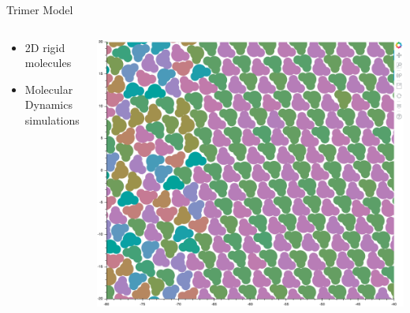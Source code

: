 \documentclass[aspectratio=169, 14pt]{beamer}
\begin{document}

\begin{frame}{Trimer Model}

  \begin{columns}
    \begin{column}{0.4\textwidth}
      \begin{itemize}
        \item 2D rigid molecules
        \item Molecular Dynamics simulations
      \end{itemize}
    \end{column}
    \begin{column}{0.6\textwidth}
      \includegraphics[width=\textwidth]{Trimer_snapshot.png}
    \end{column}
  \end{columns}
\end{frame}
\end{document}
